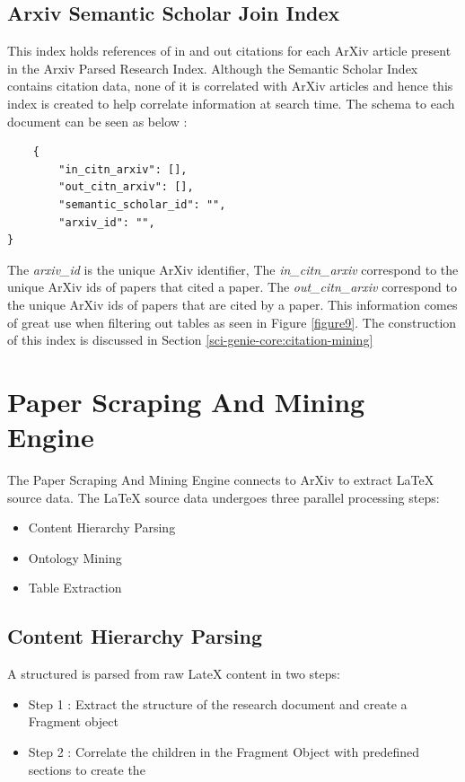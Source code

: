 \subsection{Arxiv Semantic Scholar Join Index}
\label{sci-genie-core:data-layer:ss-join-index}
This index holds references of in and out citations for each ArXiv article present in the Arxiv Parsed Research Index. Although the Semantic Scholar Index contains citation data, none of it is correlated with ArXiv articles and hence this index is created to help correlate information at search time. The schema to each document can be seen as below : 
\begin{verbatim}
    {
        "in_citn_arxiv": [],
        "out_citn_arxiv": [],
        "semantic_scholar_id": "",
        "arxiv_id": "",
}
\end{verbatim}
The \textit{arxiv\_id} is the unique ArXiv identifier, The \textit{in\_citn\_arxiv} correspond to the unique ArXiv ids of papers that cited a paper. The \textit{out\_citn\_arxiv} correspond to the unique ArXiv ids of papers that are cited by a paper. This information comes of great use when filtering out tables as seen in Figure \ref{figure9}. The construction of this index is discussed in Section \ref{sci-genie-core:citation-mining}
\section{Paper Scraping And Mining Engine}
\label{sci-genie-core:scraping}
The Paper Scraping And Mining Engine connects to ArXiv to extract LaTeX source data. The LaTeX source data undergoes three parallel processing steps:
\begin{itemize}
    \item Content Hierarchy Parsing
    \item Ontology Mining
    \item Table Extraction 
\end{itemize}

\subsection{Content Hierarchy Parsing}
A structured  is parsed from raw LateX content in two steps:
\begin{itemize}
    \item Step 1 : Extract the structure of the research document and create a Fragment object
    \item Step 2 : Correlate the children in the Fragment Object with predefined sections to create the  
\end{itemize} 
